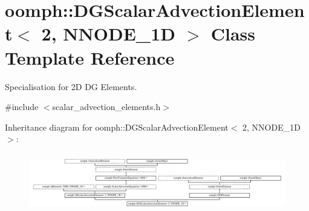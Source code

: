 \hypertarget{classoomph_1_1DGScalarAdvectionElement_3_012_00_01NNODE__1D_01_4}{}\section{oomph\+:\+:D\+G\+Scalar\+Advection\+Element$<$ 2, N\+N\+O\+D\+E\+\_\+1D $>$ Class Template Reference}
\label{classoomph_1_1DGScalarAdvectionElement_3_012_00_01NNODE__1D_01_4}


Specialisation for 2D DG Elements.  




{\ttfamily \#include $<$scalar\+\_\+advection\+\_\+elements.\+h$>$}

Inheritance diagram for oomph\+:\+:D\+G\+Scalar\+Advection\+Element$<$ 2, N\+N\+O\+D\+E\+\_\+1D $>$\+:\begin{figure}[H]
\begin{center}
\leavevmode
\includegraphics[height=2.568807cm]{classoomph_1_1DGScalarAdvectionElement_3_012_00_01NNODE__1D_01_4}
\end{center}
\end{figure}
